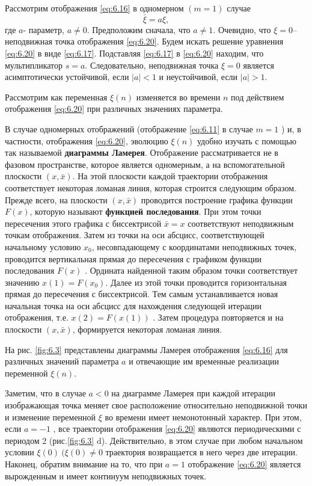 Рассмотрим отображения \eqref{eq:6.16} в одномерном $(m=1)$ случае 
\begin{equation}
        \label{eq:6.20}
        \bar{\xi} = a \xi, 
\end{equation}
где $a$- параметр, $a\neq 0$. Предположим сначала, что $a \neq 1$. Очевидно, что $\xi=0$--
неподвижная точка отображения \eqref{eq:6.20}. Будем искать решение уравнения \eqref{eq:6.20} в виде \eqref{eq:6.17}. Подставляя \eqref{eq:6.17} в \eqref{eq:6.20} находим, что мультипликатор $s = a$. Следовательно, неподвижная точка $\xi=0$ является асимптотически устойчивой, если
$|a|<1$ и неустойчивой, если $|a|>1$.

Рассмотрим как переменная $\xi(n)$ изменяется во времени $n$ под действием отображения \eqref{eq:6.20} при различных значениях параметра.

В случае одномерных отображений (отображение \eqref{eq:6.11} в случае $m=1$ ) и, в частности, отображения \eqref{eq:6.20}, эволюцию $\xi(n)$ удобно изучать с помощью так называемой 
\textbf{диаграммы Ламерея}. 
 Отображение рассматривается не в фазовом
пространстве, которое является одномерным, а на вспомогательной плоскости
$(x,\bar x)$. На этой плоскости каждой траектории отображения соответствует
некоторая ломаная линия, которая строится следующим образом. Прежде всего,
на плоскости $(x,\bar x)$ проводится построение графика функции $F(x)$, которую
называют \textbf{функцией последования}. При этом точки пересечения этого графика
с биссектрисой $\bar x = x$ соответствуют неподвижным точкам отображения. Затем
из точки на оси абсцисс, соответствующей начальному условию
$x_0$,
несовпадающему с координатами неподвижных точек, проводится
вертикальная прямая до пересечения с графиком функции последования $F(x)$ .
Ордината найденной таким образом точки соответствует значению 
$x(1) = F(x_0)$.
Далее из этой точки проводится горизонтальная прямая до пересечения с
биссектрисой. Тем самым устанавливается новая начальная точка на оси
абсцисс для нахождения следующей итерации отображения, т.е.  $x(2)=F(x(1))$ .
Затем процедура повторяется и на плоскости $(x,\bar x)$, формируется некоторая
ломаная линия.

На рис. \ref{fig:6.3} представлены диаграммы Ламерея отображения \eqref{eq:6.16} для
различных значений параметра $a$ и отвечающие им временные реализации
переменной  $\xi(n)$.

Заметим, что в случае $a<0$ на диаграмме Ламерея при каждой итерации
изображающая точка меняет свое расположение относительно неподвижной
точки и изменение переменной $\xi$ во времени имеет немонотонный характер.
При этом, если $a=-1$ , все траектории отображения \eqref{eq:6.20} являются
периодическими с периодом 2 (рис.\ref{fig:6.3} d). Действительно, в этом случае при
любом начальном условии $\xi(0) ~ (\xi(0) \neq 0$ траектория возвращается в него через
две итерации. Наконец, обратим внимание на то, что при $a=1$ отображение
\eqref{eq:6.20} является вырожденным и имеет континуум неподвижных точек.
